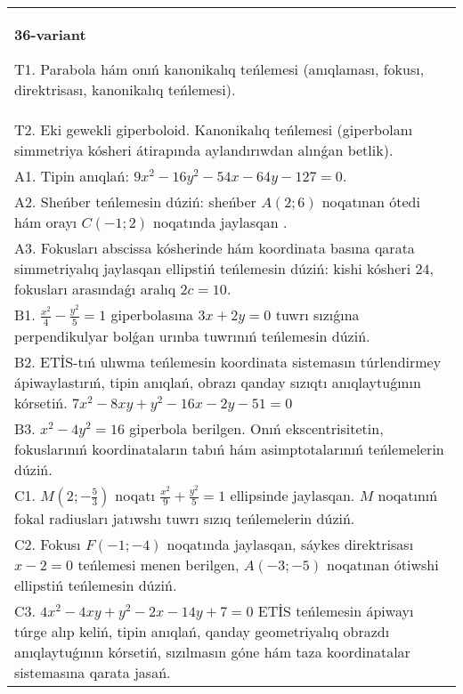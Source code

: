 \documentclass{article}
\begin{document}
\begin{tabular}{m{17cm}}
\textbf{36-variant}
\newline

T1. Parabola hám onıń kanonikalıq teńlemesi (anıqlaması, fokusı, direktrisası, kanonikalıq teńlemesi).\\

T2. Eki gewekli giperboloid. Kanonikalıq teńlemesi (giperbolanı simmetriya kósheri átirapında aylandırıwdan alınǵan betlik).\\

A1. Tipin anıqlań: $9 x^{2}-16 y^{2}-54 x-64 y-127=0$.\\

A2. Sheńber teńlemesin dúziń: sheńber $A (2;6 ) $ noqatınan ótedi hám orayı $C (-1;2) $ noqatında jaylasqan .\\

A3. Fokusları abscissa kósherinde hám koordinata basına qarata simmetriyalıq jaylasqan ellipstiń teńlemesin dúziń: kishi kósheri $24$, fokusları arasındaǵı aralıq $2 c=10$.\\

B1. $\frac{x^{2}}{4} - \frac{y^{2}}{5} = 1$ giperbolasına $3x + 2y = 0$ tuwrı sızıǵına perpendikulyar bolǵan urınba tuwrınıń teńlemesin dúziń.\\

B2. ETİS-tıń ulıwma teńlemesin koordinata sistemasın túrlendirmey ápiwaylastırıń, tipin anıqlań, obrazı qanday sızıqtı anıqlaytuǵının kórsetiń. $7x^{2} - 8xy + y^{2} - 16x - 2y - 51 = 0$  \\

B3. $x^{2} - 4y^{2} = 16$ giperbola berilgen. Onıń ekscentrisitetin, fokuslarınıń koordinataların tabıń hám asimptotalarınıń teńlemelerin dúziń.\\

C1. $M(2; - \frac{5}{3})$ noqatı $\frac{x^{2}}{9} + \frac{y^{2}}{5} = 1$ ellipsinde jaylasqan. $M$ noqatınıń fokal radiusları jatıwshı tuwrı sızıq teńlemelerin dúziń.  \\

C2. Fokusı $F( - 1; - 4)$ noqatında jaylasqan, sáykes direktrisası $x - 2 = 0$ teńlemesi menen berilgen, $A( - 3; - 5)$ noqatınan ótiwshi ellipstiń teńlemesin dúziń.  \\

C3. $4x^{2} - 4xy + y^{2} - 2x - 14y + 7 = 0$ ETİS teńlemesin ápiwayı túrge alıp keliń, tipin anıqlań, qanday geometriyalıq obrazdı anıqlaytuǵının kórsetiń, sızılmasın góne hám taza koordinatalar sistemasına qarata jasań.  \\

\end{tabular}
\vspace{1cm}
\end{document}
